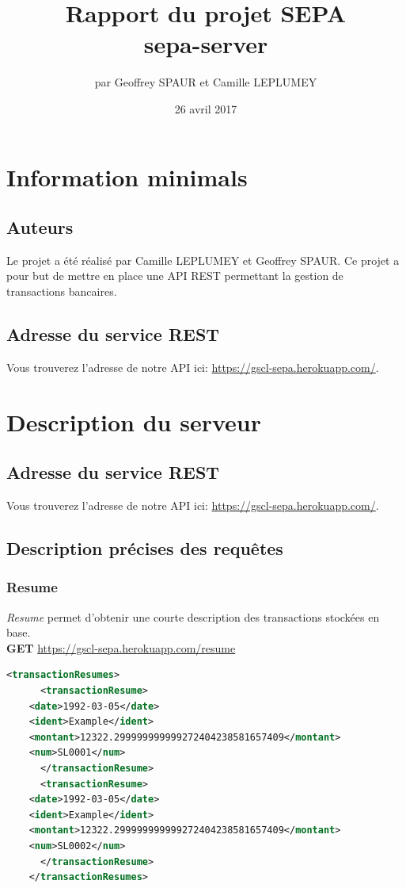 \documentclass{article}
\title{Rapport du projet SEPA \\ sepa-server}
\author{par Geoffrey SPAUR et Camille LEPLUMEY}
\date{26 avril 2017}
\begin{document}
  \maketitle
  \newpage
  \tableofcontents{}
  \newpage
  
  \section{Information minimals}
    \subsection{Auteurs}
      Le projet a été réalisé par Camille LEPLUMEY et Geoffrey SPAUR. Ce projet a pour but de mettre en place une API REST 
      permettant la gestion de transactions bancaires.
    \subsection{Adresse du service REST}
      Vous trouverez l’adresse de notre API ici: \url{https://gscl-sepa.herokuapp.com/}.
  \newpage

  \section{Description du serveur}
    \subsection{Adresse du service REST}
      Vous trouverez l’adresse de notre API ici: \url{https://gscl-sepa.herokuapp.com/}.
    \subsection{Description précises des requêtes}
      \subsubsection{Resume}
	\emph{Resume} permet d'obtenir une courte description des transactions stockées en base.\\
	\textbf{GET} \url{https://gscl-sepa.herokuapp.com/resume}
	\begin{lstlisting}[language=xml]
    <transactionResumes>
      <transactionResume>
	<date>1992-03-05</date>
	<ident>Example</ident>
	<montant>12322.299999999999272404238581657409</montant>
	<num>SL0001</num>
      </transactionResume>
      <transactionResume>
	<date>1992-03-05</date>
	<ident>Example</ident>
	<montant>12322.299999999999272404238581657409</montant>
	<num>SL0002</num>
      </transactionResume>
    </transactionResumes>
	  \end{lstlisting}
\end{document}
